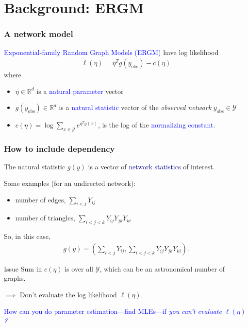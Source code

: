 \documentclass[ 10pt]{beamer}
\def\RR{{\mathbb R}}
\def\YY{{\mathcal Y}}
\newcommand{\yobs}{y_{\text{obs}}}
\begin{document}
\section{Background: ERGM}
\frame
{
\frametitle{A network model}


\textcolor{blue}{Exponential-family Random Graph Models (ERGM)} have log likelihood
\begin{align*}%
	\ell( \eta) = \eta^T g(\yobs) - c(\eta)
\end{align*}
where 
\begin{itemize}
\item $\eta \in \RR^d$ is a \textcolor{blue}{natural parameter} vector
\vspace{1mm}
\item $g(\yobs)\in\RR^d$ is a \textcolor{blue}{natural statistic} vector of the \emph{observed network} $\yobs \in \YY$
\vspace{1mm}
\item $	c(\eta) = \log \sum_{x \in \YY} e^{\eta^T g(x)}$, is the log of the 
\textcolor{blue}{normalizing constant}.
\end{itemize}




}

\frame
{
\frametitle{How to include dependency}
The natural statistic $g(y)$ is a vector of \textcolor{darkblue}{network statistics} of interest.  
\vspace{3mm}

Some examples (for an undirected network):
\begin{itemize}
	\item number of edges, $\sum_{i<j} Y_{ij}$
	\item number of triangles, $\sum_{i < j < k} Y_{ij}Y_{jk}Y_{ki}$
\end{itemize}
\vspace{2mm}

So, in this case,
\begin{align*}
	g(y) = \left( \sum_{i<j} Y_{ij}, 
					\sum_{i < j < k} Y_{ij}Y_{jk}Y_{ki} \right ).
\end{align*}
\vspace{1mm}

\pause
\begin{alertblock}{Issue}
Sum in $c(\eta)$ is over all $\YY$, which can be an astronomical number of graphs.
\vspace{1mm}

$\implies$ Don't evaluate the log likelihood $\ell(\eta)$.

\vspace{3mm}

\textcolor{blue}{How can you do parameter estimation---find MLEs---if \emph{you can't 
evaluate $\ell(\eta)$?} }
\end{alertblock}
}
\end{document}
